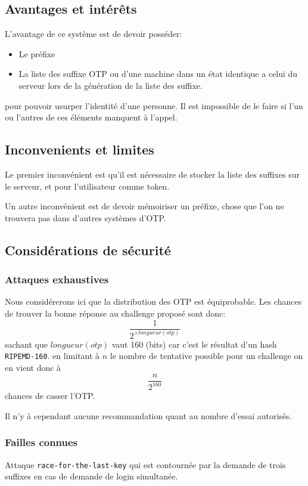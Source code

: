 \documentclass{../res/univ-projet}
\begin{document}
\subsection{Avantages et intér\^ets}
L'avantage de ce système est de devoir posséder:
\begin{itemize}
    \item Le préfixe
    \item La liste des suffixe OTP ou d'une machine dans un état
        identique a celui du serveur lors de la génération de la liste des
        suffixe.
\end{itemize} 
pour pouvoir usurper l'identité d'une personne.
Il est impossible de le faire si l'un ou l'autres de ces éléments
manquent à l'appel.

\subsection{Inconvenients et limites}
Le premier inconvénient est qu'il est nécessaire de stocker la liste
des suffixes sur le serveur, et pour l'utilisateur comme token.

Un autre inconvénient est de devoir mémoiriser un préfixe, chose que
l'on ne trouvera pas dans d'autres systèmes d'OTP. 

\subsection{Considérations de sécurité}
\subsubsection{Attaques exhaustives}
Nous considérerons ici que la distribution des OTP est équiprobable.
Les chances de trouver la bonne réponse au challenge proposé sont donc:
        \[\frac{1}{2^{\times longueur(otp)}}\]
sachant que $longueur(otp)$ vaut 160 (bits) car c'est le r\'esultat d'un hash
\verb?RIPEMD-160?.
en limitant à $n$ le nombre de tentative possible pour un challenge
on en vient donc à \[\frac{n}{2^{160}}\] chances
de casser l'OTP.

Il n'y à cependant aucune recommandation quant au nombre d'essai 
autoris\'es.

\subsubsection{Failles connues}
Attaque \verb?race-for-the-last-key? qui est contourn\'ee par
la demande de trois suffixes en cas de demande de login simultan\'ee.
\end{document}
